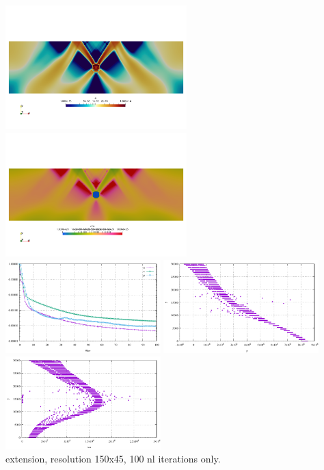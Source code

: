 \begin{center}
\includegraphics[width=7cm]{python_codes/fieldstone_70/extension/e}
\includegraphics[width=7cm]{python_codes/fieldstone_70/extension/etaeff}\\
\includegraphics[width=6cm]{python_codes/fieldstone_70/extension/conv.pdf}
\includegraphics[width=6cm]{python_codes/fieldstone_70/extension/pressure.pdf}\\
\includegraphics[width=6cm]{python_codes/fieldstone_70/extension/tau.pdf}\\
extension, resolution 150x45, 100 nl iterations only.
\end{center}

